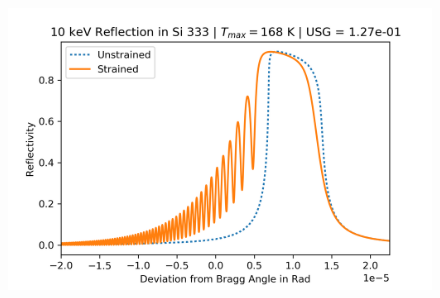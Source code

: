 \documentclass[preprint]{iucr}              %
\begin{document}
\begin{figure}
\includegraphics{images/333_10keV_8.png}
\label{fig:333usg10kev}
\end{figure}
\end{document}
